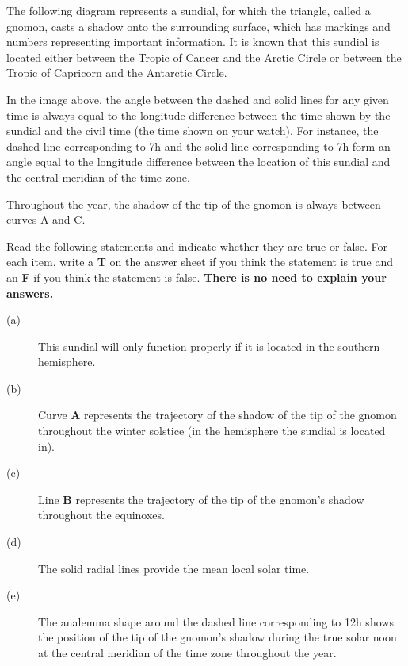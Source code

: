 The following diagram represents a sundial, for which the triangle, called a
gnomon, casts a shadow onto the surrounding surface, which has markings and
numbers representing important information. It is known that this sundial is
located either between the Tropic of Cancer and the Arctic Circle or between
the Tropic of Capricorn and the Antarctic Circle.

In the image above, the angle between the dashed and solid lines for any given
time is always equal to the longitude difference between the time shown by the
sundial and the civil time (the time shown on your watch). For instance, the
dashed line corresponding to 7h and the solid line corresponding to 7h form an
angle equal to the longitude difference between the location of this sundial
and the central meridian of the time zone.

Throughout the year, the shadow of the tip of the gnomon is always between
curves A and C.

Read the following statements and indicate whether they are true or false. For
each item, write a \textbf{T} on the answer sheet if you think the statement is
true and an \textbf{F} if you think the statement is false. \textbf{There is no
need to explain your answers.}

\begin{description}
\item[(a)] This sundial will only function properly if it is located in the
  southern hemisphere.
\item[(b)] Curve \textbf{A} represents the trajectory of the shadow of the tip
  of the gnomon throughout the winter solstice (in the hemisphere the sundial
  is located in).
\item[(c)] Line \textbf{B} represents the trajectory of the tip of the gnomon's
  shadow throughout the equinoxes.
\item[(d)] The solid radial lines provide the mean local solar time.
\item[(e)] The analemma shape around the dashed line corresponding to 12h shows
  the position of the tip of the gnomon's shadow during the true solar noon at
  the central meridian of the time zone throughout the year.
\end{description}
